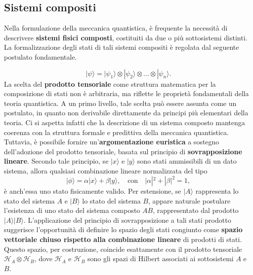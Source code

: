 \documentclass[a4paper,12pt]{report}
\theoremstyle{plain}
\begin{document}
\subsection{Sistemi compositi}
Nella formulazione della meccanica quantistica, è frequente la necessità di descrivere \textbf{sistemi fisici composti}, costituiti da due o più sottosistemi distinti. La formalizzazione degli stati di tali sistemi compositi è regolata dal seguente postulato fondamentale.
\begin{center}
\end{center}
\[
|\psi\rangle = |\psi_1\rangle \otimes |\psi_2\rangle \otimes \dots \otimes |\psi_n\rangle.
\]
La scelta del \textbf{prodotto tensoriale} come struttura matematica per la composizione di stati non è arbitraria, ma riflette le proprietà fondamentali della teoria quantistica. A un primo livello, tale scelta può essere assunta come un postulato, in quanto non derivabile direttamente da principi più elementari della teoria. Ci si aspetta infatti che la descrizione di un sistema composto mantenga coerenza con la struttura formale e predittiva della meccanica quantistica.
Tuttavia, è possibile fornire un'\textbf{argomentazione euristica} a sostegno dell'adozione del prodotto tensoriale, basata sul principio di \textbf{sovrapposizione lineare}. Secondo tale principio, se $|x\rangle$ e $|y\rangle$ sono stati ammissibili di un dato sistema, allora qualsiasi combinazione lineare normalizzata del tipo
\[
|\phi\rangle = \alpha|x\rangle + \beta|y\rangle, \quad \text{con} \quad |\alpha|^2 + |\beta|^2 = 1,
\]
è anch'essa uno stato fisicamente valido. Per estensione, se $|A\rangle$ rappresenta lo stato del sistema $A$ e $|B\rangle$ lo stato del sistema $B$, appare naturale postulare l'esistenza di uno stato del sistema composto $AB$, rappresentato dal prodotto $|A\rangle|B\rangle$. L'applicazione del principio di sovrapposizione a tali stati prodotto suggerisce l'opportunità di definire lo spazio degli stati congiunto come \textbf{spazio vettoriale chiuso rispetto alla combinazione lineare} di prodotti di stati. Questo spazio, per costruzione, coincide esattamente con il prodotto tensoriale $\mathcal{H}_A \otimes \mathcal{H}_B$, dove $\mathcal{H}_A$ e $\mathcal{H}_B$ sono gli spazi di Hilbert associati ai sottosistemi $A$ e $B$.
\end{document}
